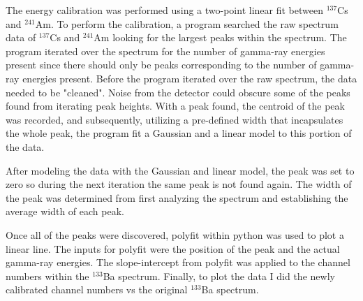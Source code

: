 The energy calibration was performed using a two-point linear fit between
$^{137}$Cs and $^{241}$Am. To perform the calibration, a program searched
the raw spectrum data of $^{137}$Cs and $^{241}$Am looking for
the largest peaks within the spectrum. The program iterated over the spectrum for the
number of gamma-ray energies present since there should only be peaks corresponding
to the number of gamma-ray energies present. Before the program iterated over the raw spectrum,
the data needed to be "cleaned". Noise from the detector could obscure some of the peaks
found from iterating peak heights. With a peak found, the centroid of the peak was
recorded, and subsequently, utilizing a pre-defined width that incapsulates
the whole peak, the program fit a Gaussian and a linear model to this portion of the data.

After modeling the data with the Gaussian and linear model, the peak was
set to zero so during the next iteration the same peak is not found again.
The width of the peak was determined from first analyzing the spectrum and establishing
the average width of each peak. 

Once all of the peaks were discovered, polyfit within python was used to
plot a linear line. The inputs for polyfit were the position of the peak and
the actual gamma-ray energies. The slope-intercept from polyfit was applied
to the channel numbers within the $^{133}$Ba spectrum. Finally, to plot the data
I did the newly calibrated channel numbers vs the original $^{133}$Ba spectrum.
